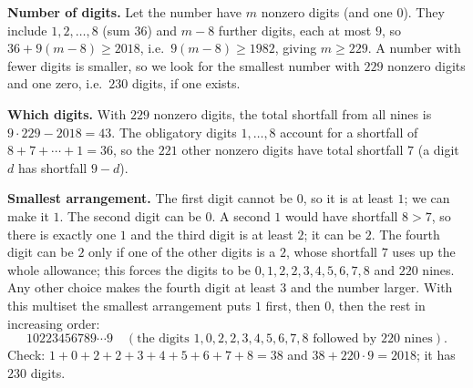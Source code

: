 \textbf{Number of digits.} Let the number have $m$ nonzero digits (and one $0$). They include $1,2,\dots,8$ (sum $36$) and $m-8$ further digits, each at most $9$, so $36+9(m-8)\ge2018$, i.e.\ $9(m-8)\ge1982$, giving $m\ge229$. A number with fewer digits is smaller, so we look for the smallest number with $229$ nonzero digits and one zero, i.e.\ $230$ digits, if one exists.

\textbf{Which digits.} With $229$ nonzero digits, the total shortfall from all nines is $9\cdot229-2018=43$. The obligatory digits $1,\dots,8$ account for a shortfall of $8+7+\cdots+1=36$, so the $221$ other nonzero digits have total shortfall $7$ (a digit $d$ has shortfall $9-d$).

\textbf{Smallest arrangement.} The first digit cannot be $0$, so it is at least $1$; we can make it $1$. The second digit can be $0$. A second $1$ would have shortfall $8>7$, so there is exactly one $1$ and the third digit is at least $2$; it can be $2$. The fourth digit can be $2$ only if one of the other digits is a $2$, whose shortfall $7$ uses up the whole allowance; this forces the digits to be $0,1,2,2,3,4,5,6,7,8$ and $220$ nines. Any other choice makes the fourth digit at least $3$ and the number larger. With this multiset the smallest arrangement puts $1$ first, then $0$, then the rest in increasing order:
\[
\boxed{10223456789\cdots9}\quad(\text{the digits }1,0,2,2,3,4,5,6,7,8\text{ followed by }220\text{ nines}).
\]
Check: $1+0+2+2+3+4+5+6+7+8=38$ and $38+220\cdot9=2018$; it has $230$ digits.
